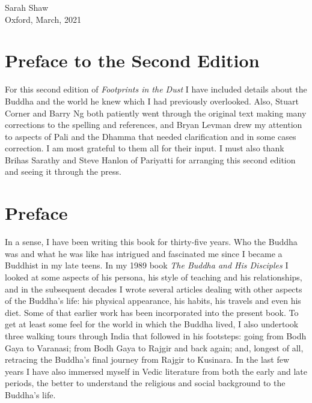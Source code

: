 Sarah Shaw\\
Oxford, March, 2021

\label{footprints_split_001.html_calibre_pb_3}

\label{footprints_split_002.html}{}

\section{Preface to the Second
Edition}\label{footprints_split_002.html_TOCTarget0-3}

For this second edition of \emph{Footprints in the Dust} I have included
details about the Buddha and the world he knew which I had previously
overlooked. Also, Stuart Corner and Barry Ng both patiently went through
the original text making many corrections to the spelling and
references, and Bryan Levman drew my attention to aspects of Pali and
the Dhamma that needed clarification and in some cases correction. I am
most grateful to them all for their input. I must also thank Brihas
Sarathy and Steve Hanlon of Pariyatti for arranging this second edition
and seeing it through the press.

\label{footprints_split_002.html_calibre_pb_5}

\label{footprints_split_003.html}{}

\section{Preface}\label{footprints_split_003.html_TOCTarget0-4}

In a sense, I have been writing this book for thirty-five years. Who the
Buddha was and what he was like has intrigued and fascinated me since I
became a Buddhist in my late teens. In my 1989 book \emph{The Buddha and
His Disciples} I looked at some aspects of his persona, his style of
teaching and his relationships, and in the subsequent decades I wrote
several articles dealing with other aspects of the Buddha's life: his
physical appearance, his habits, his travels and even his diet. Some of
that earlier work has been incorporated into the present book. To get at
least some feel for the world in which the Buddha lived, I also
undertook three walking tours through India that followed in his
footsteps: going from Bodh Gaya to Varanasi; from Bodh Gaya to Rajgir
and back again; and, longest of all, retracing the Buddha's final
journey from Rajgir to Kusinara. In the last few years I have also
immersed myself in Vedic literature from both the early and late
periods, the better to understand the religious and social background to
the Buddha's life.

